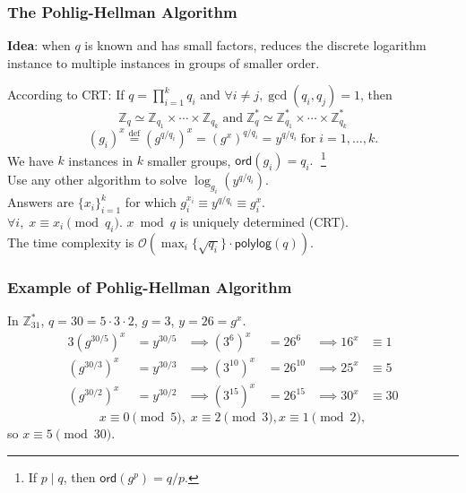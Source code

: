 \begin{frame}\frametitle{The Pohlig-Hellman Algorithm}
\textbf{Idea}: when $q$ is known and has small factors, reduces the discrete logarithm instance to multiple instances in groups of smaller order.
\newline

According to CRT: If $q=\prod^k_{i=1}q_i$ and $\forall i\neq j, \gcd(q_i,q_j)=1$, then
\[ \mathbb{Z}_q \simeq \mathbb{Z}_{q_1} \times \cdots \times \mathbb{Z}_{q_k}\; \text{and}\; \mathbb{Z}^*_q \simeq \mathbb{Z}^*_{q_1} \times \cdots \times \mathbb{Z}^*_{q_k} \]
\[(g_i)^x\overset{\text{def}}{=} \left( g^{q/q_i} \right)^x = (g^x)^{q/q_i} = y^{q/q_i}\; \text{for}\; i=1,\dotsc,k.\]
We have $k$ instances in $k$ smaller groups, $\mathsf{ord}(g_i) = q_i.\;$ \footnote{If $p \mid q$, then $\mathsf{ord}(g^p)=q/p$.}\\
Use any other algorithm to solve $\log_{g_i}  (y^{q/q_i})$.\\
Answers are $\{x_i\}^k_{i=1}$ for which $g_i^{x_i} \equiv y^{q/q_i} \equiv g_i^x$. \\
$\forall i,\;x \equiv x_i \pmod{q_i}$. $x \bmod q$ is uniquely determined (CRT). \\
The time complexity is $\mathcal{O}(\max_i\{\sqrt{q_i}\}\cdot \mathsf{polylog}(q))$.
\end{frame}
\begin{frame}\frametitle{Example of Pohlig-Hellman Algorithm}
\begin{exampleblock}{In $\mathbb{Z}^*_{31}$, $q=30=5\cdot 3 \cdot 2$, $g=3$, $y=26=g^x$.}
\begin{alignat*}{3}
(g^{30/5})^x & = y^{30/5} & \implies (3^{6})^x\;\, & = 26^{6} & \implies 16^x & \equiv 1 \\
(g^{30/3})^x & = y^{30/3} & \implies (3^{10})^x & = 26^{10} & \implies 25^x & \equiv 5 \\
(g^{30/2})^x & = y^{30/2} & \implies (3^{15})^x & = 26^{15} & \implies 30^x & \equiv 30 
\end{alignat*}
\[ x \equiv 0 \pmod 5,\; x \equiv 2 \pmod 3, x \equiv 1 \pmod 2, \]
so $x \equiv 5 \pmod{30}$.
\end{exampleblock}
\end{frame}
